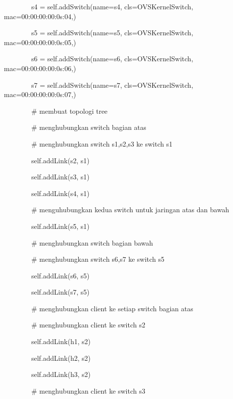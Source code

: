 \ \ \ \ \ \ \ \ s4 = self.addSwitch(name={\textquotedbl}s4{\textquotedbl}, cls=OVSKernelSwitch,
mac={\textquotedbl}00:00:00:00:0s:04{\textquotedbl},)

\ \ \ \ \ \ \ \ s5 = self.addSwitch(name={\textquotedbl}s5{\textquotedbl}, cls=OVSKernelSwitch,
mac={\textquotedbl}00:00:00:00:0s:05{\textquotedbl},)

\ \ \ \ \ \ \ \ s6 = self.addSwitch(name={\textquotedbl}s6{\textquotedbl}, cls=OVSKernelSwitch,
mac={\textquotedbl}00:00:00:00:0s:06{\textquotedbl},)

\ \ \ \ \ \ \ \ s7 = self.addSwitch(name={\textquotedbl}s7{\textquotedbl}, cls=OVSKernelSwitch,
mac={\textquotedbl}00:00:00:00:0s:07{\textquotedbl},)


\bigskip

\ \ \ \ \ \ \ \ \# membuat topologi tree

\ \ \ \ \ \ \ \ \# menghubungkan switch bagian atas

\ \ \ \ \ \ \ \ \# menghubungkan switch s1,s2,s3 ke switch s1

\ \ \ \ \ \ \ \ self.addLink(s2, s1)

\ \ \ \ \ \ \ \ self.addLink(s3, s1)

\ \ \ \ \ \ \ \ self.addLink(s4, s1)


\bigskip

\ \ \ \ \ \ \ \ \# menguhubungkan kedua switch untuk jaringan atas dan bawah

\ \ \ \ \ \ \ \ self.addLink(s5, s1)


\bigskip

\ \ \ \ \ \ \ \ \# menghubungkan switch bagian bawah

\ \ \ \ \ \ \ \ \# menghubungkan switch s6,s7 ke switch s5

\ \ \ \ \ \ \ \ self.addLink(s6, s5)

\ \ \ \ \ \ \ \ self.addLink(s7, s5)


\bigskip

\ \ \ \ \ \ \ \ \# menghubungkan client ke setiap switch bagian atas

\ \ \ \ \ \ \ \ \# menghubungkan client ke switch s2

\ \ \ \ \ \ \ \ self.addLink(h1, s2)

\ \ \ \ \ \ \ \ self.addLink(h2, s2)

\ \ \ \ \ \ \ \ self.addLink(h3, s2)


\bigskip

\ \ \ \ \ \ \ \ \# menghubungkan client ke switch s3


